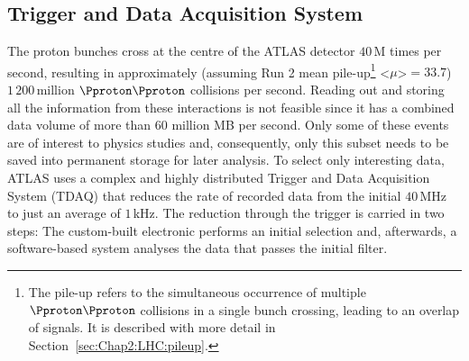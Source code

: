 \subsection{Trigger and Data Acquisition System}
\label{sec:Chap2:Trigger_and_DAQ}
The proton bunches cross at the centre of the ATLAS detector $40\,$M times per second, resulting in approximately 
(assuming Run 2 mean pile-up\footnote{The pile-up refers to the simultaneous occurrence of multiple $\Pproton \Pproton$ 
collisions in a single bunch crossing, leading to an overlap of signals. It is described with
more detail in Section~\ref{sec:Chap2:LHC:pileup}.} <$\mu$>$=33.7$)
 $1\,200\,$million $\Pproton \Pproton$ collisions per second. 
Reading out and storing all the information from these interactions is not feasible since it has a combined data volume of more than 60 million MB per second.
Only some of these events are of interest to physics studies and, consequently, only this subset needs to be saved into permanent storage for later analysis.
To select only interesting data, ATLAS uses a complex and highly distributed Trigger and Data Acquisition System (TDAQ) 
\cite{ATLAS:2003aa} that reduces the rate of 
recorded data from the initial $40\,$MHz to just an average of $1\,$kHz. The reduction through the trigger is carried in two steps: 
The custom-built electronic performs an initial selection and, afterwards, a software-based system analyses the data that passes the initial filter. 





